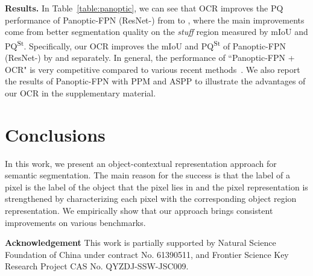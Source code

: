 \documentclass[runningheads]{llncs}
\begin{document}
\noindent\textbf{Results.}
In Table~\ref{table:panoptic},
we can see that OCR improves the PQ performance of Panoptic-FPN (ResNet-) from  to , where the main improvements
come from better segmentation quality on the \emph{stuff} region measured by
mIoU and PQ\textsuperscript{St}.
Specifically,
our OCR improves the mIoU and PQ\textsuperscript{St} of
Panoptic-FPN (ResNet-)
by  and  separately.
In general, the performance of ``Panoptic-FPN + OCR" is very competitive compared to various recent methods~\cite{xiong19upsnet,liu2019end,yang2019sognet}.
We also report the results of Panoptic-FPN with PPM and ASPP to
illustrate the advantages of our OCR in the supplementary material.


\section{Conclusions}
In this work,
we present an object-contextual representation
approach for 
semantic segmentation.
The main reason for the success  
is that the label of a pixel
is the label of the object
that the pixel lies in
and the pixel representation
is strengthened
by characterizing each pixel
with the corresponding object region representation.
We empirically show that our approach
brings consistent improvements on various benchmarks.

\noindent \textbf{Acknowledgement}
This work is partially supported by Natural Science Foundation of China under contract No. 61390511, and Frontier Science Key Research Project CAS No. QYZDJ-SSW-JSC009.


\small

\end{document}
